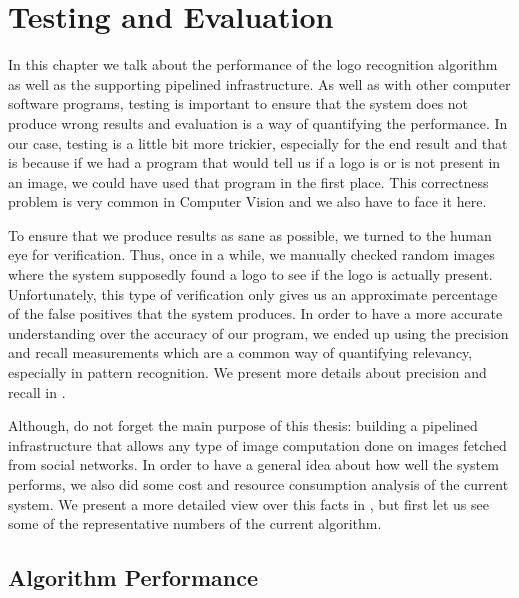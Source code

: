 \chapter{Testing and Evaluation}

In this chapter we talk about the performance of the logo recognition
algorithm as well as the supporting pipelined infrastructure. As well as with
other computer software programs, testing is important to ensure that the
system does not produce wrong results and evaluation is a way of quantifying
the performance. In our case, testing is a little bit more trickier,
especially for the end result and that is because if we had a program that would
tell us if a logo is or is not present in an image, we could have used that
program in the first place. This correctness problem is very common in
Computer Vision and we also have to face it here.

To ensure that we produce results as sane as possible, we turned to the human
eye for verification. Thus, once in a while, we manually checked random images
where the system supposedly found a logo to see if the logo is actually
present. Unfortunately, this type of verification only gives us an approximate
percentage of the false positives that the system produces. In order to have a
more accurate understanding over the accuracy of our program, we ended up
using the precision and recall measurements which are a common way of
quantifying relevancy, especially in pattern recognition. We present more
details about precision and recall in .

Although, do not forget the main purpose of this thesis: building a pipelined
infrastructure that allows any type of image computation done on images
fetched from social networks. In order to have a general idea about how well
the system performs, we also did some cost and resource consumption analysis of
the current system. We present a more detailed view over this facts in
, but first let us see some of
the representative numbers of the current algorithm.

\section{Algorithm Performance}
\label{sec:alg-perf}

